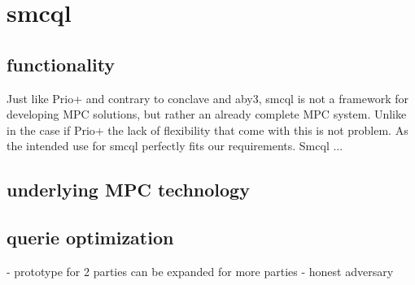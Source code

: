 \section{smcql}

\subsection{functionality}
Just like Prio+ and contrary to conclave and aby3, smcql is not a framework for developing MPC solutions, but rather an already complete MPC system. Unlike in the case if Prio+ the lack of flexibility that come with this is not problem. As the intended use for smcql perfectly fits our requirements. Smcql ...

\subsection{underlying MPC technology}


\subsection{querie optimization   }





- prototype for 2 parties can be expanded for more parties
- honest adversary